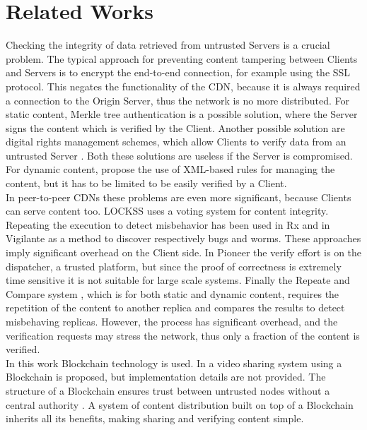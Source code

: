 \documentclass[hidelinks,conference,compsoc]{IEEEtran}
\begin{document}
\section{Related Works}
Checking the integrity of data retrieved from untrusted Servers is a crucial problem. The typical approach for preventing content tampering between Clients and Servers is to encrypt the end-to-end connection, for example using the SSL protocol.
This negates the functionality of the CDN, because it is always required a connection to the Origin Server, thus the network is no more distributed. For static content, Merkle tree authentication \cite{bayardo2005merkle} is a possible solution, where the Server signs the content which is verified by the Client. Another possible solution are digital rights management schemes, which allow Clients to verify data from an untrusted Server \cite{adelsbach2005towards}. Both these solutions are useless if the Server is compromised. 
For dynamic content, \cite{chi2002xml}\cite{orman2001data} propose the use of XML-based rules for managing the content, but it has to be limited to be easily verified by a Client.\\
In peer-to-peer CDNs these problems are even more significant, because Clients can serve content too. LOCKSS\cite{maniatis2003preserving} uses a voting system for content integrity. 
Repeating the execution to detect misbehavior has been used in Rx\cite{qin2005rx} and in Vigilante \cite{costa2005vigilante} as a method to discover respectively bugs and worms. These approaches imply significant overhead on the Client side. In Pioneer\cite{seshadri2005pioneer} the verify effort is on the dispatcher, a trusted platform, but since the proof of correctness is extremely time sensitive it is not suitable for large scale systems.
Finally the Repeate and Compare system \cite{michalakis2007ensuring}, which is for both static and dynamic content, requires the repetition of the content to another replica and compares the results to detect misbehaving replicas. However, the process has significant overhead, and the verification requests may stress the network, thus only a fraction of the content is verified.\\
In this work Blockchain technology is used. In \cite{kishigami2015blockchain} a video sharing system using a Blockchain is proposed, but implementation details are not provided. The structure of a Blockchain ensures trust between untrusted nodes without a central authority \cite{nakamoto2008bitcoin}. A system of content distribution built on top of a Blockchain inherits all its benefits, making sharing and verifying content simple. 
\end{document}
